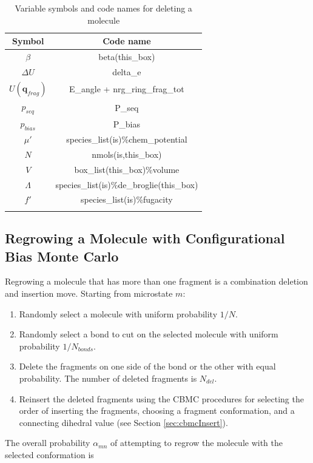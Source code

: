 \begin{table}
\caption{Variable symbols and code names for deleting a molecule}
\label{table:cbmcDelete}
\centering
\begin{tabular}{|c|c|} \hline
 {\bf Symbol} & {\bf Code name} \\ \hline
 $\beta$ & beta(this\_box) \\
 $\Delta U$ & delta\_e \\
 $U(\mathbf{q}_{frag})$ & E\_angle + nrg\_ring\_frag\_tot \\
 $p_{seq}$ & P\_seq \\
 $p_{bias}$ & P\_bias \\
 $\mu'$ & species\_list(is)\%chem\_potential \\
 $N$ & nmols(is,this\_box) \\
 $V$ & box\_list(this\_box)\%volume \\
 $\Lambda$ & species\_list(is)\%de\_broglie(this\_box) \\
 $f'$ & species\_list(is)\%fugacity \\
 \hline
\multicolumn{2}{c}{}
\end{tabular}
\end{table}

\subsection{Regrowing a Molecule with Configurational Bias Monte Carlo}
\label{sec:cbmcRegrow}
Regrowing a molecule that has more than one fragment is a combination deletion and insertion move. Starting from microstate $m$:

\begin{enumerate}
	\item Randomly select a molecule with uniform probability $1/N$.
	\item Randomly select a bond to cut on the selected molecule with uniform probability $1/N_{bonds}$.
	\item Delete the fragments on one side of the bond or the other with equal probability. The number of deleted fragments is $N_{del}$.
	\item Reinsert the deleted fragments using the CBMC procedures for selecting the order of inserting the fragments, choosing a fragment conformation, and a connecting dihedral value (see Section \ref{sec:cbmcInsert}).
\end{enumerate}

The overall probability $\alpha_{mn}$ of attempting to regrow the molecule with the selected conformation is 

